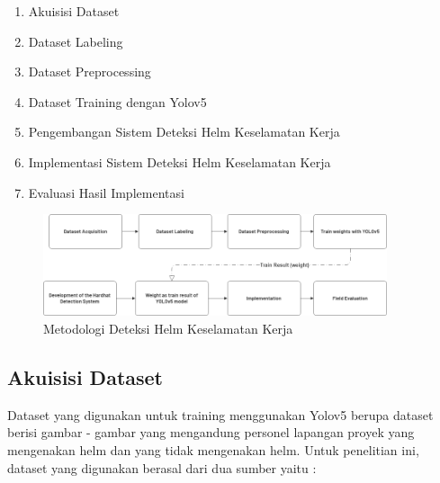 \begin{enumerate}[nolistsep]  
  \item Akuisisi Dataset
  \item Dataset Labeling 
  \item Dataset Preprocessing  
  \item Dataset Training dengan Yolov5  
  \item Pengembangan Sistem Deteksi Helm Keselamatan Kerja
  \item Implementasi Sistem Deteksi Helm Keselamatan Kerja 
  \item Evaluasi Hasil Implementasi
\end{enumerate}

\begin{figure} [ht]
  \centering
  \includegraphics[width=0.9\textwidth]{gambar/utilities/methodologi_hardhat.png}

  \caption{Metodologi Deteksi Helm Keselamatan Kerja}
  \label{fig:hedec_method}
\end{figure}

\subsection{Akuisisi Dataset}
\label{subsec:DatasetAcquisition}

\par Dataset yang digunakan untuk training menggunakan Yolov5 berupa dataset berisi gambar - gambar yang mengandung personel lapangan proyek yang mengenakan helm dan yang tidak mengenakan helm. Untuk penelitian ini, dataset yang digunakan berasal dari dua sumber yaitu :

